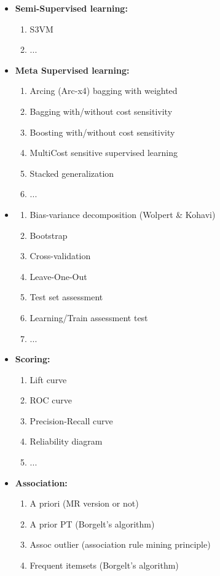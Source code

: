 \begin{itemize}
		\item \textbf{Semi-Supervised learning:}
		\begin{enumerate}
			\item S3VM
			\item ...
		\end{enumerate}
		\item \textbf{Meta Supervised learning:}
		\begin{enumerate}
			\item Arcing (Arc-x4) bagging with weighted
			\item Bagging with/without cost sensitivity
			\item Boosting  with/without cost sensitivity
			\item MultiCost sensitive supervised learning
			\item Stacked generalization
			\item ...
		\end{enumerate}
		\item \textbf{}
		\begin{enumerate}
			\item Bias-variance decomposition (Wolpert \& Kohavi)
			\item Bootstrap
			\item Cross-validation
			\item Leave-One-Out
			\item Test set assessment
			\item Learning/Train assessment test
			\item ...
		\end{enumerate}
		\item \textbf{Scoring:}
		\begin{enumerate}
			\item Lift curve
			\item ROC curve
			\item Precision-Recall curve
			\item Reliability diagram
			\item ...
		\end{enumerate}
		\item \textbf{Association:}
		\begin{enumerate}
			\item A priori (MR version or not)
			\item A prior PT (Borgelt's algorithm)
			\item Assoc outlier (association rule mining principle)
			\item Frequent itemsets (Borgelt's algorithm)

\end{enumerate}
\end{itemize}
